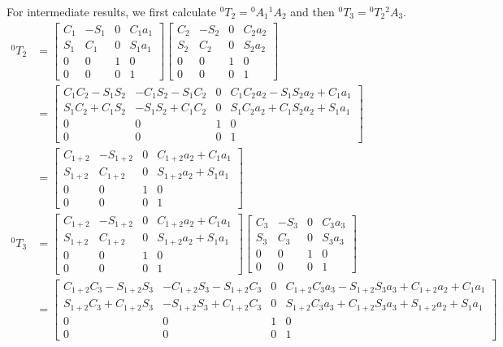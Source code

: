 \documentclass[a4paper,11pt]{article}
\begin{document}
\begin {enumerate}
\begin{enumerate}
    For intermediate results, we first calculate $^0T_2 = {^0A_1}{^1A_2}$ and then $^0T_3 = {^0T_2}{^2A_3}$.
    \begin{align*}
    	^0T_2 &= \begin{bmatrix} C_1 & -S_1 & 0 & C_1a_1\\ S_1 & C_1 & 0 & S_1a_1\\ 0 & 0 & 1 & 0\\ 0 & 0 & 0 & 1 \end{bmatrix} \begin{bmatrix} C_2 & -S_2 & 0 & C_2a_2\\ S_2 & C_2 & 0 & S_2a_2\\ 0 & 0 & 1 & 0\\ 0 & 0 & 0 & 1 \end{bmatrix}\\
    	&= \begin{bmatrix} C_1C_2 - S_1S_2 & -C_1S_2 - S_1C_2 & 0 & C_1C_2a_2 -S_1S_2a_2 + C_1a_1\\ S_1C_2 + C_1S_2 & -S_1S_2 + C_1C_2 & 0 & S_1C_2a_2 + C_1S_2a_2 + S_1a_1\\ 0 & 0 & 1 & 0\\ 0 & 0 & 0 & 1 \end{bmatrix}\\
    	&= \begin{bmatrix} C_{1+2} & -S_{1+2} & 0 & C_{1+2}a_2 + C_1a_1\\ S_{1+2} & C_{1+2} & 0 & S_{1+2}a_2 + S_1a_1\\ 0 & 0 & 1 & 0\\ 0 & 0 & 0 & 1 \end{bmatrix}\\
    	^0T_3 &= \begin{bmatrix} C_{1+2} & -S_{1+2} & 0 & C_{1+2}a_2 + C_1a_1\\ S_{1+2} & C_{1+2} & 0 & S_{1+2}a_2 + S_1a_1\\ 0 & 0 & 1 & 0\\ 0 & 0 & 0 & 1 \end{bmatrix} \begin{bmatrix} C_3 & -S_3 & 0 & C_3a_3\\ S_3 & C_3 & 0 & S_3a_3\\ 0 & 0 & 1 & 0\\ 0 & 0 & 0 & 1 \end{bmatrix}\\
    	&= \begin{bmatrix} C_{1+2}C_3 - S_{1+2}S_3 & -C_{1+2}S_3 - S_{1+2}C_3 & 0 & C_{1+2}C_3a_3 - S_{1+2}S_3a_3 + C_{1+2}a_2+C_1a_1\\ S_{1+2}C_3 + C_{1+2}S_3 & -S_{1+2}S_3+C_{1+2}C_3 & 0 & S_{1+2}C_3a_3 + C_{1+2}S_3a_3 + S_{1+2}a_2 + S_1a_1\\ 0 & 0 & 1 & 0\\ 0 & 0 & 0 & 1 \end{bmatrix}\\

\end{align*}
\end{enumerate}
\end{enumerate}
\end{document}
